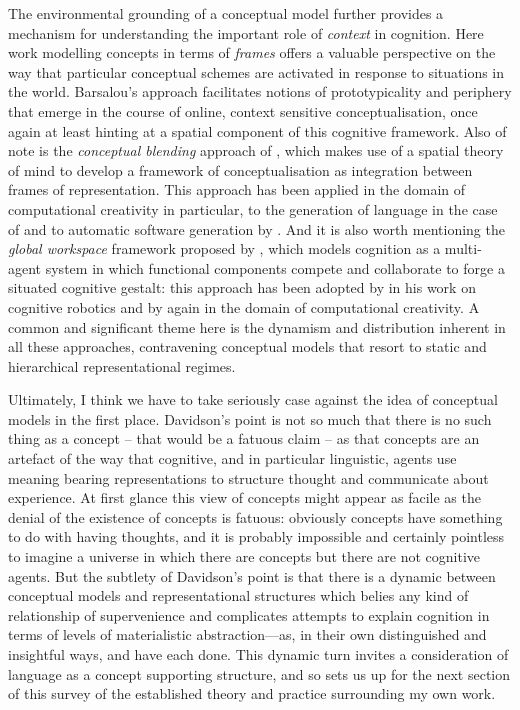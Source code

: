 The environmental grounding of a conceptual model further provides a mechanism for understanding the important role of \emph{context} in cognition.  Here  work modelling concepts in terms of \emph{frames} offers a valuable perspective on the way that particular conceptual schemes are activated in response to situations in the world.  Barsalou's approach facilitates notions of prototypicality and periphery that emerge in the course of online, context sensitive conceptualisation, once again at least hinting at a spatial component of this cognitive framework.  Also of note is the \emph{conceptual blending} approach of \cite{FauconnierEA1998}, which makes use of a spatial theory of mind to develop a framework of conceptualisation as integration between frames of representation.  This approach has been applied in the domain of computational creativity in particular, to the generation of language in the case of \cite{Veale2012b} and to automatic software generation by \cite{ZnidarsicEA2016}.  And it is also worth mentioning the \emph{global workspace} framework proposed by \cite{Baars1988}, which models cognition as a multi-agent system in which functional components compete and collaborate to forge a situated cognitive gestalt: this approach has been adopted by \cite{Shanahan2010} in his work on cognitive robotics and by \cite{Wiggins2012} again in the domain of computational creativity.  A common and significant theme here is the dynamism and distribution inherent in all these approaches, contravening conceptual models that resort to static and hierarchical representational regimes.

Ultimately, I think we have to take seriously  case against the idea of conceptual models in the first place.  Davidson's point is not so much that there is no such thing as a concept -- that would be a fatuous claim -- as that concepts are an artefact of the way that cognitive, and in particular linguistic, agents use meaning bearing representations to structure thought and communicate about experience.  At first glance this view of concepts might appear as facile as the denial of the existence of concepts is fatuous: obviously concepts have something to do with having thoughts, and it is probably impossible and certainly pointless to imagine a universe in which there are concepts but there are not cognitive agents.  But the subtlety of Davidson's point is that there is a dynamic between conceptual models and representational structures which belies any kind of relationship of supervenience and complicates attempts to explain cognition in terms of levels of materialistic abstraction---as, in their own distinguished and insightful ways, \cite{Floridi2011} and \cite{Deacon2011} have each done.  This dynamic turn invites a consideration of language as a concept supporting structure, and so sets us up for the next section of this survey of the established theory and practice surrounding my own work.

